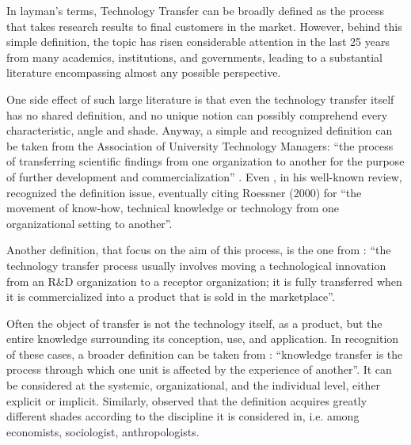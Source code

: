 

\label{Chapter1} %


In layman's terms, Technology Transfer can be broadly defined as the process that takes research results to final customers in the market. However, behind this simple definition, the topic has risen considerable attention in the last 25 years from many academics, institutions, and governments, leading to a substantial literature encompassing almost any possible perspective.

One side effect of such large literature is that even the technology transfer itself has no shared definition, and no unique notion can possibly comprehend every characteristic, angle and shade. Anyway, a simple and recognized definition can be taken from the Association of University Technology Managers: \enquote{the process of transferring scientific findings from one organization to another for the purpose of further development and commercialization} \citep{Genshaft2016}. Even \citet{Bozeman2000}, in his well-known review, recognized the definition issue, eventually citing Roessner (2000) for \enquote{the movement of know-how, technical knowledge or technology from one organizational setting to another}. 

Another definition, that focus on the aim of this process, is the one from \citet{Rogers2001}: \enquote{the technology transfer process usually involves moving a technological innovation from an R\&D organization to a receptor organization; it is fully transferred when it is commercialized into a product that is sold in the marketplace}. 

Often the object of transfer is not the technology itself, as a product, but the entire knowledge surrounding its conception, use, and application. In recognition of these cases, a broader definition can be taken from \citet{Argote2000}: \enquote{knowledge transfer is the process through which one unit is affected by the experience of another}. It can be considered at the systemic, organizational, and the individual level, either explicit or implicit. Similarly, \citet{Zhao1992} observed that the definition acquires greatly different shades according to the discipline it is considered in, i.e. among economists, sociologist, anthropologists. 

